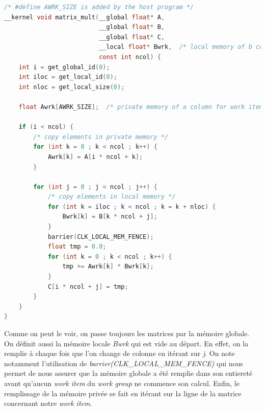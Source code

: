 \begin{lstlisting}[language=c]
/* #define AWRK_SIZE is added by the host program */
__kernel void matrix_mult(__global float* A,
                          __global float* B,
                          __global float* C,
                          __local float* Bwrk,  /* local memory of b column for work group */
                          const int ncol) {
    int i = get_global_id(0);
    int iloc = get_local_id(0);
    int nloc = get_local_size(0);

    float Awrk[AWRK_SIZE];  /* private memory of a column for work item */

    if (i < ncol) {
        /* copy elements in private memory */
        for (int k = 0 ; k < ncol ; k++) {
            Awrk[k] = A[i * ncol + k];
        }

        for (int j = 0 ; j < ncol ; j++) {
            /* copy elements in local memory */
            for (int k = iloc ; k < ncol ; k = k + nloc) {
                Bwrk[k] = B[k * ncol + j];
            }
            barrier(CLK_LOCAL_MEM_FENCE);
            float tmp = 0.0;
            for (int k = 0 ; k < ncol ; k++) {
                tmp += Awrk[k] * Bwrk[k];
            }
            C[i * ncol + j] = tmp;
        }
    }
}
\end{lstlisting}
\vspace{20pt}

Comme on peut le voir, on passe toujours les matrices par la mémoire globale. 
On définit aussi la mémoire locale \textit{Bwrk} qui est vide au 
départ. En effet, on la remplie à chaque fois que l'on change de colonne en 
itérant sur \textit{j}. On note notamment 
l'utilisation de \textit{barrier\@(CLK\_LOCAL\_MEM\_FENCE)} qui nous permet de 
nous assurer que la mémoire globale a été remplie dans son entiereté avant 
qu'aucun \textit{work item} du \textit{work group} ne commence son calcul. 
Enfin, le remplissage de la mémoire privée se fait en itérant sur la ligne 
de la matrice concernant notre \textit{work item}.

